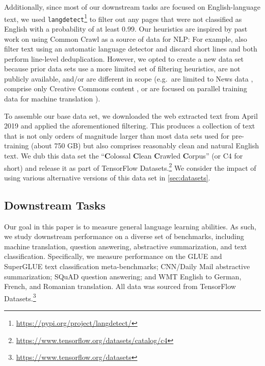 \documentclass[twoside,11pt]{article}
\begin{document}
Additionally, since most of our downstream tasks are focused on English-language text, we used \texttt{langdetect}\footnote{\url{https://pypi.org/project/langdetect/}} to filter out any pages that were not classified as English with a probability of at least 0.99.
Our heuristics are inspired by past work on using Common Crawl as a source of data for NLP:
For example, \citet{grave2018learning} also filter text using an automatic language detector and discard short lines and \citet{smith2013dirt,grave2018learning} both perform line-level deduplication.
However, we opted to create a new data set because prior data sets use a more limited set of filtering heuristics, are not publicly available, and/or are different in scope (e.g.\ are limited to News data \citep{zellers2019defending,liu2019roberta}, comprise only Creative Commons content \citep{habernal2016c4corpus}, or are focused on parallel training data for machine translation \citep{smith2013dirt}).

To assemble our base data set, we downloaded the web extracted text from April 2019 and applied the aforementioned filtering.
This produces a collection of text that is not only orders of magnitude larger than most data sets used for pre-training (about 750 GB) but also comprises reasonably clean and natural English text.
We dub this data set the ``\textbf{C}olossal \textbf{C}lean \textbf{C}rawled \textbf{C}orpus'' (or C4 for short) and release it as part of TensorFlow Datasets.\footnote{\url{https://www.tensorflow.org/datasets/catalog/c4}}
We consider the impact of using various alternative versions of this data set in \cref{sec:datasets}.

\subsection{Downstream Tasks}
\label{sec:tasks}

Our goal in this paper is to measure general language learning abilities.
As such, we study downstream performance on a diverse set of benchmarks, including machine translation, question answering, abstractive summarization, and text classification.
Specifically, we measure performance on the GLUE and SuperGLUE text classification meta-benchmarks; CNN/Daily Mail abstractive summarization; SQuAD question answering; and WMT English to German, French, and Romanian translation.
All data was sourced from TensorFlow Datasets.\footnote{\url{https://www.tensorflow.org/datasets}}
\end{document}
